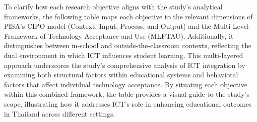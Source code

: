 \documentclass[
]{article}
\begin{document}
To clarify how each research objective aligns with the study's
analytical frameworks, the following table maps each objective to the
relevant dimensions of PISA's CIPO model (Context, Input, Process, and
Output) and the Multi-Level Framework of Technology Acceptance and Use
(MLFTAU). Additionally, it distinguishes between in-school and
outside-the-classroom contexts, reflecting the dual environment in which
ICT influences student learning. This multi-layered approach underscores
the study's comprehensive analysis of ICT integration by examining both
structural factors within educational systems and behavioral factors
that affect individual technology acceptance. By situating each
objective within this combined framework, the table provides a visual
guide to the study's scope, illustrating how it addresses ICT's role in
enhancing educational outcomes in Thailand across different settings.
\end{document}
